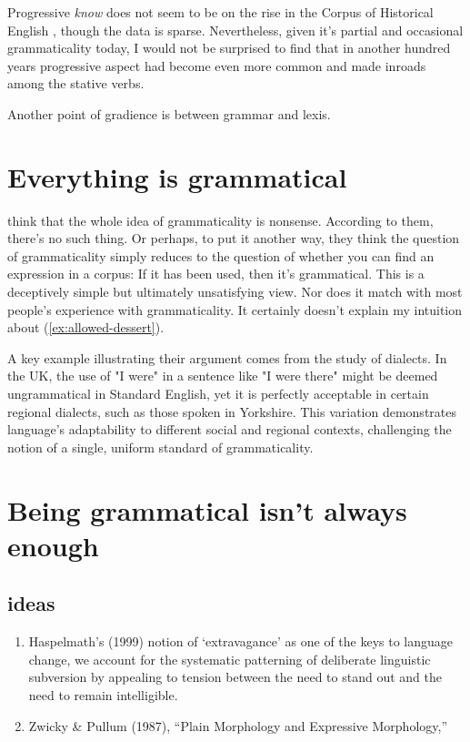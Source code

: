 Progressive \textit{know} does not seem to be on the rise in the Corpus of Historical English \citep{Granath2014}, though the data is sparse. Nevertheless, given it's partial and occasional grammaticality today, I would not be surprised to find that in another hundred years progressive aspect had become even more common and made inroads among the stative verbs.

Another point of gradience is between grammar and lexis.

\section{Everything is grammatical}

\citet{Sampson2014b} think that the whole idea of grammaticality is nonsense. According to them, there's no such thing. Or perhaps, to put it another way, they think the question of grammaticality simply reduces to the question of whether you can find an expression in a corpus: If it has been used, then it's grammatical. This is a deceptively simple but ultimately unsatisfying view. Nor does it match with most people's experience with grammaticality. It certainly doesn't explain my intuition about (\ref{ex:allowed-dessert}).

A key example illustrating their argument comes from the study of dialects. In the UK, the use of "I were" in a sentence like "I were there" might be deemed ungrammatical in Standard English, yet it is perfectly acceptable in certain regional dialects, such as those spoken in Yorkshire. This variation demonstrates language's adaptability to different social and regional contexts, challenging the notion of a single, uniform standard of grammaticality.


\section{Being grammatical isn't always enough}

\subsection{ideas}
\begin{enumerate}
    \item Haspelmath's (1999) notion of `extravagance' as one of the keys to language change, we account for the systematic patterning of deliberate linguistic subversion by appealing to tension between the need to stand out and the need to remain intelligible.
    \item Zwicky \& Pullum (1987), ``Plain Morphology and Expressive Morphology,''
\end{enumerate}

